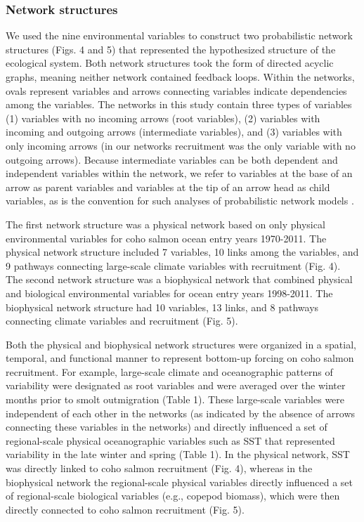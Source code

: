 \subsubsection{Network structures}

We used the nine environmental variables to construct two probabilistic network
structures (Figs. 4 and 5) that represented the hypothesized structure of the
ecological system. Both network structures took the form of directed acyclic
graphs, meaning neither network contained feedback loops. Within the networks,
ovals represent variables and arrows connecting variables indicate dependencies
among the variables.  The networks in this study contain three types of
variables (1) variables with no incoming arrows (root variables), (2) variables
with incoming and outgoing arrows (intermediate variables), and (3) variables
with only incoming arrows (in our networks recruitment was the only variable
with no outgoing arrows). Because intermediate variables can be both dependent
and independent variables within the network, we refer to variables at the base
of an arrow as parent variables and variables at the tip of an arrow head as
child variables, as is the convention for such analyses of probabilistic network
models \citep{Koller2009a, Korb2004a}.

The first network structure was a physical network based on only physical
environmental variables for coho salmon ocean entry years 1970-2011. The
physical network structure included 7 variables, 10 links among the variables,
and 9 pathways connecting large-scale climate variables with recruitment (Fig.
4). The second network structure was a biophysical network that combined
physical and biological environmental variables for ocean entry years 1998-2011.
The biophysical network structure had 10 variables, 13 links, and 8 pathways
connecting climate variables and recruitment (Fig. 5).

Both the physical and biophysical network structures were organized in a
spatial, temporal, and functional manner to represent bottom-up forcing on coho
salmon recruitment. For example, large-scale climate and oceanographic patterns
of variability were designated as root variables and were averaged over the
winter months prior to smolt outmigration (Table 1). These large-scale variables
were independent of each other in the networks (as indicated by the absence of
arrows connecting these variables in the networks) and directly influenced a set
of regional-scale physical oceanographic variables such as SST that represented
variability in the late winter and spring (Table 1). In the physical network,
SST was directly linked to coho salmon recruitment (Fig. 4), whereas in the
biophysical network the regional-scale physical variables directly influenced a
set of regional-scale biological variables (e.g., copepod biomass), which were
then directly connected to coho salmon recruitment (Fig. 5).



